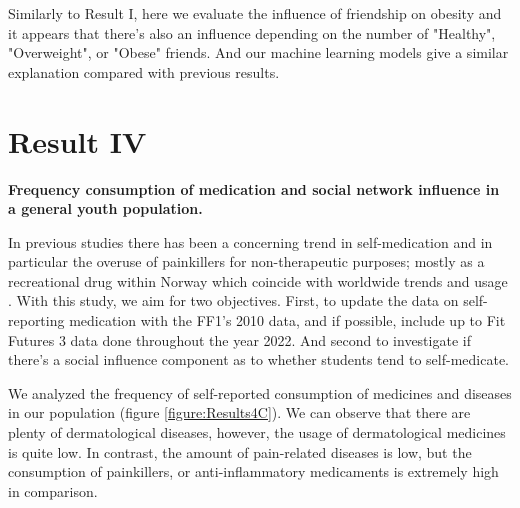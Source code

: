 Similarly to Result I, here we evaluate the influence of friendship on obesity and it appears that there's also an influence depending on the number of "Healthy", "Overweight", or "Obese" friends. And our machine learning models give a similar explanation compared with previous results.

\clearpage



\section{Result IV}

\textbf{Frequency consumption of medication and social network influence in a general youth population.}

In previous studies there has been a concerning trend in self-medication and in particular the overuse of painkillers for non-therapeutic purposes; mostly as a recreational drug within Norway \cite{ref:selfMedicationA, ref:selfMedicationB, Lorentzen2018} which coincide with worldwide trends and usage \cite{Algarni2021, ijerph18115530, PolandSelfMedicate, Lein2023}. With this study, we aim for two objectives. First, to update the data on self-reporting medication with the FF1's 2010 data, and if possible, include up to Fit Futures 3 data done throughout the year 2022. And second to investigate if there's a social influence component as to whether students tend to self-medicate.


We analyzed the frequency of self-reported consumption of medicines and diseases in our population (figure \ref{figure:Results4C}). We can observe that there are plenty of dermatological diseases, however, the usage of dermatological medicines is quite low. In contrast, the amount of pain-related diseases is low, but the consumption of painkillers, or anti-inflammatory medicaments is extremely high in comparison.

